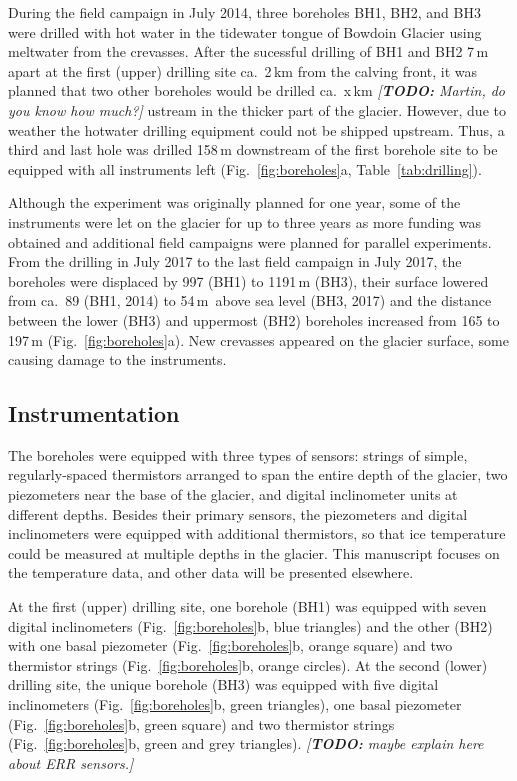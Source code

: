 \documentclass[utf8]{article}
\newcommand{\todo}[1]{\textcolor{c3}{\emph{[\textbf{TODO:} #1]}}}
\begin{document}
    During the field campaign in July 2014, three boreholes BH1, BH2, and BH3
    were drilled with hot water in the tidewater tongue of Bowdoin Glacier
    using meltwater from the crevasses. After the sucessful drilling of BH1
    and BH2 7\,m apart at the first (upper) drilling site ca.~2\,km from the
    calving front, it was planned that two other boreholes would be drilled
    ca.~x\,km \todo{Martin, do you know how much?}
    ustream in the thicker part of the glacier. However, due to weather the
    hotwater drilling equipment could not be shipped upstream. Thus, a third
    and last hole was drilled 158\,m downstream of the first borehole site
    to be equipped with all instruments left (Fig.~\ref{fig:boreholes}a,
    Table~\ref{tab:drilling}).

    Although the experiment was originally planned for one year, some of the
    instruments were let on the glacier for up to three years as more funding
    was obtained and additional field campaigns were planned for parallel
    experiments. From the drilling in July 2017 to the last field campaign in
    July 2017, the boreholes were displaced by 997 (BH1) to 1191\,m (BH3),
    their surface lowered from ca.~89 (BH1, 2014) to 54\,m~above sea level
    (BH3, 2017) and
    the distance between the lower (BH3) and uppermost (BH2) boreholes
    increased from 165 to 197\,m (Fig.~\ref{fig:boreholes}a). New crevasses
    appeared on the glacier surface, some causing damage to the instruments.


\subsection{Instrumentation}

    The boreholes were equipped with three types of sensors: strings of simple,
    regularly-spaced thermistors arranged to span the entire depth of the
    glacier, two piezometers near the base of the glacier, and digital
    inclinometer units at different depths. Besides their primary sensors, the
    piezometers and digital inclinometers were equipped with additional
    thermistors, so that ice temperature could be measured at multiple depths
    in the glacier. This manuscript focuses on the temperature data, and other
    data will be presented elsewhere.

    At the first (upper) drilling site, one borehole (BH1) was equipped with
    seven digital inclinometers (Fig.~\ref{fig:boreholes}b, blue triangles) and
    the other (BH2) with one basal piezometer (Fig.~\ref{fig:boreholes}b,
    orange square) and two thermistor strings (Fig.~\ref{fig:boreholes}b,
    orange circles). At the second (lower) drilling site, the unique
    borehole (BH3) was equipped with five digital inclinometers
    (Fig.~\ref{fig:boreholes}b, green triangles), one basal piezometer
    (Fig.~\ref{fig:boreholes}b, green square) and two thermistor strings
    (Fig.~\ref{fig:boreholes}b, green and grey triangles).
    \todo{maybe explain here about ERR sensors.}
\end{document}
